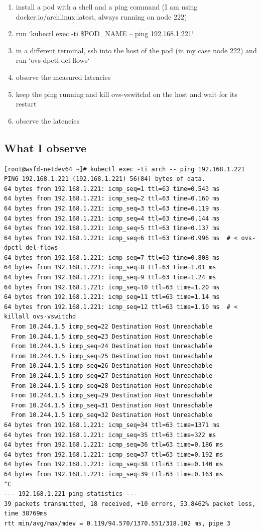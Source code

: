 \begin{enumerate}
\item install a pod with a shell and a ping command (I am using docker.io/archlinux:latest, always running on node 222)
\item run `kubectl exec -ti \$POD\_NAME -- ping 192.168.1.221`
\item in a different terminal, ssh into the host of the pod (in my case node 222) and run `ovs-dpctl del-flows`
\item observe the measured latencies
\item keep the ping running and kill ovs-vswitchd on the host and wait for its restart
\item observe the latencies
\end{enumerate}


\subsection{What I observe}


\begin{verbatim}
[root@wsfd-netdev64 ~]# kubectl exec -ti arch -- ping 192.168.1.221
PING 192.168.1.221 (192.168.1.221) 56(84) bytes of data.
64 bytes from 192.168.1.221: icmp_seq=1 ttl=63 time=0.543 ms
64 bytes from 192.168.1.221: icmp_seq=2 ttl=63 time=0.160 ms
64 bytes from 192.168.1.221: icmp_seq=3 ttl=63 time=0.119 ms
64 bytes from 192.168.1.221: icmp_seq=4 ttl=63 time=0.144 ms
64 bytes from 192.168.1.221: icmp_seq=5 ttl=63 time=0.137 ms
64 bytes from 192.168.1.221: icmp_seq=6 ttl=63 time=0.996 ms  # < ovs-dpctl del-flows
64 bytes from 192.168.1.221: icmp_seq=7 ttl=63 time=0.808 ms
64 bytes from 192.168.1.221: icmp_seq=8 ttl=63 time=1.01 ms
64 bytes from 192.168.1.221: icmp_seq=9 ttl=63 time=1.24 ms
64 bytes from 192.168.1.221: icmp_seq=10 ttl=63 time=1.20 ms
64 bytes from 192.168.1.221: icmp_seq=11 ttl=63 time=1.14 ms
64 bytes from 192.168.1.221: icmp_seq=12 ttl=63 time=1.10 ms  # < killall ovs-vswitchd
  From 10.244.1.5 icmp_seq=22 Destination Host Unreachable
  From 10.244.1.5 icmp_seq=23 Destination Host Unreachable
  From 10.244.1.5 icmp_seq=24 Destination Host Unreachable
  From 10.244.1.5 icmp_seq=25 Destination Host Unreachable
  From 10.244.1.5 icmp_seq=26 Destination Host Unreachable
  From 10.244.1.5 icmp_seq=27 Destination Host Unreachable
  From 10.244.1.5 icmp_seq=28 Destination Host Unreachable
  From 10.244.1.5 icmp_seq=29 Destination Host Unreachable
  From 10.244.1.5 icmp_seq=31 Destination Host Unreachable
  From 10.244.1.5 icmp_seq=32 Destination Host Unreachable
64 bytes from 192.168.1.221: icmp_seq=34 ttl=63 time=1371 ms
64 bytes from 192.168.1.221: icmp_seq=35 ttl=63 time=322 ms
64 bytes from 192.168.1.221: icmp_seq=36 ttl=63 time=0.186 ms
64 bytes from 192.168.1.221: icmp_seq=37 ttl=63 time=0.192 ms
64 bytes from 192.168.1.221: icmp_seq=38 ttl=63 time=0.140 ms
64 bytes from 192.168.1.221: icmp_seq=39 ttl=63 time=0.163 ms
^C
--- 192.168.1.221 ping statistics ---
39 packets transmitted, 18 received, +10 errors, 53.8462% packet loss, time 38769ms
rtt min/avg/max/mdev = 0.119/94.570/1370.551/318.102 ms, pipe 3
\end{verbatim}

